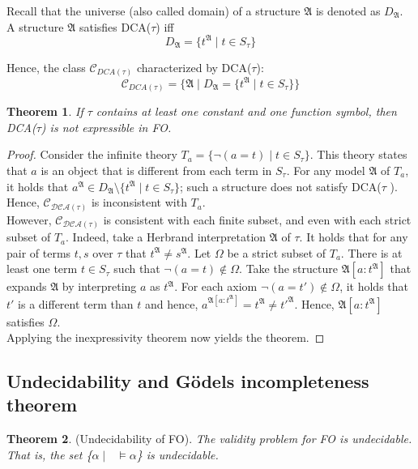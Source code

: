 \documentclass[10pt,a4paper]{article}
\theoremstyle{definition}
\newtheorem{theorem}{Theorem}
\begin{document}
Recall that the universe (also called domain) of a structure $\mathfrak{A}$ is denoted as $D_\mathfrak{A}$. A structure $\mathfrak{A}$ satisfies DCA($\tau$) iff $$D_\mathfrak{A} = \{t^\mathfrak{A} \mid t \in S_\tau\}$$

Hence, the class $\mathcal{C}_{DCA(\tau)}$ characterized by DCA($\tau$): $$\mathcal{C}_{DCA(\tau)} = \{\mathfrak{A} \mid D_\mathfrak{A} = \{t^\mathfrak{A} \mid t \in S_\tau\}\}$$

\begin{theorem}
\textit{If $\tau$ contains at least one constant and one function symbol, then DCA($\tau$) is not expressible in FO.}
\end{theorem}

\begin{proof}
Consider the infinite theory $T_a = \{ \lnot(a=t) \mid t\in S_\tau\}$. This theory states that $a$ is an object that is different from each term in $S_\tau$. For any model $\mathfrak{A}$ of $T_a$, it holds that $a^\mathfrak{A} \in D_\mathfrak{A} \setminus \{t^\mathfrak{A} \mid t \in S_\tau\}$; such a structure does not satisfy DCA($\tau$ ). Hence, $\mathcal{C_{DCA(\tau)}}$ is inconsistent with $T_a$.\\

However, $\mathcal{C_{DCA(\tau)}}$ is consistent with each finite subset, and even with each strict subset of $T_a$. Indeed, take a Herbrand interpretation $\mathfrak{A}$ of $\tau$. It holds that for any pair of terms $t, s$ over $\tau$ that $t^\mathfrak{A} \neq s^\mathfrak{A}$. Let $\Omega$ be a strict subset of $T_a$. There is at least one term $t \in S_\tau$ such that $\lnot (a = t) \not \in \Omega$. Take the structure $\mathfrak{A}[a : t^\mathfrak{A}]$ that expands $\mathfrak{A}$ by interpreting $a$ as $t^\mathfrak{A}$. For each axiom $\lnot(a=t')\not\in\Omega$, it holds that $t'$ is a different term than $t$ and hence, $a^{\mathfrak{A}[a : t^\mathfrak{A}]} = t^\mathfrak{A} \neq {t'}^\mathfrak{A}$. Hence, $\mathfrak{A}[a : t^\mathfrak{A}]$ satisfies $\Omega$.\\

Applying the inexpressivity theorem now yields the theorem.
\end{proof}

\subsection{Undecidability and G\"{o}dels incompleteness theorem}

\begin{theorem}
(Undecidability of FO). \textit{The validity problem for FO is undecidable. That is, the set \{$\alpha \mid \text{ } \models \alpha$\} is undecidable.}
\end{theorem}
\end{document}
